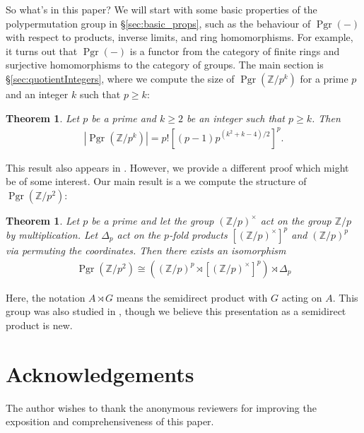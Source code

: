 \documentclass[oneside]{amsart}
\theoremstyle{nthm}
\newtheorem{thm2}[subsection]{Theorem}
\theoremstyle{ndef}
\theoremstyle{nrem}
\newcommand{\Z}{\mathbb{Z}}
\DeclareMathOperator{\Pgr}{Pgr}
\begin{document}
So what's in this paper? We will start with some basic properties of the polypermutation group in \S\ref{sec:basic_props}, such as the behaviour of $\Pgr(-)$ with respect to products, inverse limits, and ring homomorphisms.  For example, it turns out that $\Pgr(-)$ is a functor from the category of finite rings and surjective homomorphisms to the category of groups. The main section is \S\ref{sec:quotientIntegers}, where we compute the size of  $\Pgr(\Z/p^k)$ for a prime $p$ and an integer $k$ such that $p \geq k$:
\begin{thm2}
    Let $p$ be a prime and $k \geq 2$ be an integer such that $p \geq k$. Then
    \begin{align*}
        |\Pgr(\Z/p^k)| = p![(p-1)p^{(k^2+k-4)/2}]^p.
    \end{align*}
\end{thm2}
This result also appears in \cite{MR764615}. However, we provide a different proof which might be of some interest. Our main result is a  we compute the structure of $\Pgr(\Z/p^2)$:
\begin{thm2}
    Let $p$ be a prime and let the group $(\Z/p)^\times$ act on the group $\Z/p$ by multiplication. Let $\Delta_p$ act on the $p$-fold products $[(\Z/p)^\times]^p$ and $(\Z/p)^p$ via permuting the coordinates. Then there exists an isomorphism
    \begin{align*}
        \Pgr(\Z/p^2)\cong ( (\Z/p)^p\rtimes [(\Z/p)^\times]^p)\rtimes \Delta_p
    \end{align*}
\end{thm2}
Here, the notation $A\rtimes G$ means the semidirect product with $G$ acting on $A$. This group was also studied in \cite{MR71467}, though we believe this presentation as a semidirect product is new.

\section*{Acknowledgements} The author wishes to thank the anonymous reviewers for improving the exposition and comprehensiveness of this paper.
\end{document}
